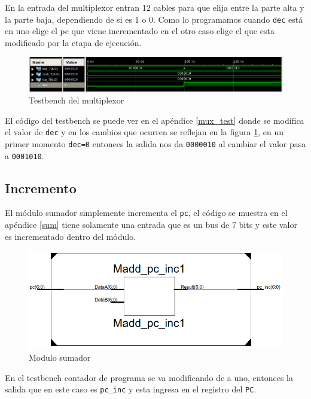 En la entrada del multiplexor entran 12 cables para que elija entre la parte alta y la parte baja, dependiendo de si es 1 o 0. Como lo programamos cuando \texttt{dec} est\'a en uno elige el \ac{pc}  que viene incrementado en el otro caso elige el que esta modificado por la etapa de ejecución.

\begin{figure}[H]
\centering
\includegraphics[scale=0.4]{Capitulo01/mux_test}
\caption{Testbench del multiplexor}
\label{fig:muxt}
\end{figure}

El c\'odigo del testbench se puede ver en el apéndice \ref{mux_test} donde se modifica el valor de \texttt{dec} y en los cambios que ocurren se reflejan en la figura \ref{fig:muxt}, en un primer momento \texttt{dec=0} entonces la salida nos da \texttt{0000010} al cambiar el valor pasa a \texttt{0001010}.

\subsection{Incremento}
El m\'odulo sumador simplemente incrementa el \texttt{pc}, el código se muestra en el apéndice \ref{sum}  tiene solamente una entrada que es un bus de 7 bits y este valor es incrementado dentro del m\'odulo. 


\begin{figure}[H]
\centering
\includegraphics[scale=0.45]{img/sumador_inside}
\caption{Modulo sumador}
\label{fig:sumador}
\end{figure}


En el testbench contador de programa se va modificando de a uno, entonces la salida que en este caso es \texttt{pc\_inc} y esta ingresa en el registro del \texttt{PC}. 



